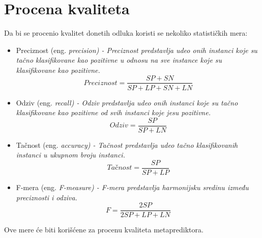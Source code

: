 \section{Procena kvaliteta}
Da bi se procenio kvalitet donetih odluka koristi se nekoliko statističkih mera:
\begin{itemize}
\item Preciznost (eng. \em{precision}) - Preciznost predstavlja udeo onih instanci koje su tačno klasifikovane kao pozitivne u odnosu na sve instance koje su klasifikovane kao pozitivne. 
$$Preciznost = \frac{SP + SN}{SP + LP + SN + LN}$$
\item Odziv (eng.  \em{recall}) - Odziv predstavlja udeo onih instanci koje su tačno klasifikovane kao pozitivne od svih instanci koje jesu pozitivne.
$$Odziv = \frac{SP}{SP + LN}$$
\item Tačnost (eng. \em{accuracy}) - Tačnost predstavlja udeo tačno klasifikovanih instanci u ukupnom broju instanci.
$$Tačnost = \frac{SP}{SP + LP}$$
\item F-mera (eng. \em{F-measure}) - F-mera predstavlja harmonijsku sredinu između preciznosti i odziva. 
$$F = \frac{2SP}{2SP + LP + LN}$$
\end{itemize} 
Ove mere će biti korišćene za procenu kvaliteta metaprediktora.

